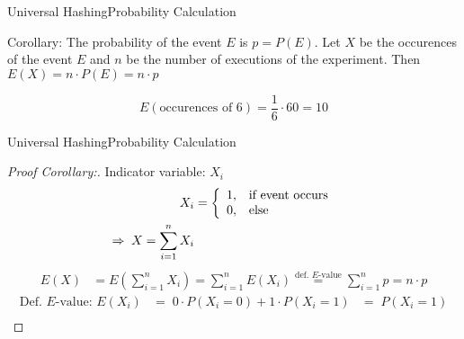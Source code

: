 
\begin{frame}{Universal Hashing}{Probability Calculation}
  \begin{block}{Corollary:}
    The probability of the event $E$ is $p = P(E)$.
    Let $X$ be the occurences of the event $E$ and $n$ be the number
    of executions of the experiment. Then {\color{Mittel-Blau}$E(X) = n \cdot P(E) = n \cdot p$}
  \end{block}
  \begin{example}
    \[E\left(\text{occurences of 6}\right) = \frac{1}{6} \cdot 60 = 10\]
  \end{example}
\end{frame}


\begin{frame}{Universal Hashing}{Probability Calculation}
  \begin{proof}[Proof Corollary:]
    Indicator variable: {\color{Mittel-Blau}$X_i$}\\
    \vspace*{-1.5em}
            {\color{Mittel-Blau}
    \begin{align*}
      X_i &=
        \left\lbrace
          \begin{array}{ll}
            1, & \text{if event occurs}\\
            0, & \text{else}
          \end{array}
          \right. \hspace{1.5em}\\
        \Rightarrow \; X = \sum_{i=1}^{n} X_i
    \end{align*}}
    \vspace*{-1.0em}
            {\color{Mittel-Blau}
    \begin{align*}
      E(X) &= E\left(\sum_{i=1}^{n} X_i\right)
        = \sum_{i=1}^{n} E(X_i)
        \stackrel{\text{def. $E$-value}}{=}
        \sum_{i=1}^{n} p = n \cdot p
    \end{align*}
    \qedhere
    \vspace*{-1.0em}
    \begin{align*}
        \text{Def. $E$-value: }  E(X_i) &= \; 0 \cdot P(X_i = 0) + 1 \cdot P(X_i = 1) &= \; P(X_i = 1) \\[0.5em]   
    \end{align*}}
  \end{proof}
\end{frame}

